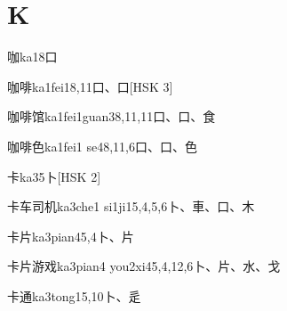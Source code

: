 
\section*{K}

\begin{EntryWithPhonetic}{咖}{ka1}{8}{⼝}
\end{EntryWithPhonetic}

\begin{EntryWithPhonetic}{咖啡}{ka1fei1}{8,11}{⼝、⼝}[HSK 3]
\end{EntryWithPhonetic}

\begin{EntryWithPhonetic}{咖啡馆}{ka1fei1guan3}{8,11,11}{⼝、⼝、⾷}
\end{EntryWithPhonetic}

\begin{EntryWithPhonetic}{咖啡色}{ka1fei1 se4}{8,11,6}{⼝、⼝、⾊}
\end{EntryWithPhonetic}

\begin{EntryWithPhonetic}{卡}{ka3}{5}{⼘}[HSK 2]
\end{EntryWithPhonetic}

\begin{EntryWithPhonetic}{卡车司机}{ka3che1 si1ji1}{5,4,5,6}{⼘、⾞、⼝、⽊}
\end{EntryWithPhonetic}

\begin{EntryWithPhonetic}{卡片}{ka3pian4}{5,4}{⼘、⽚}
\end{EntryWithPhonetic}

\begin{EntryWithPhonetic}{卡片游戏}{ka3pian4 you2xi4}{5,4,12,6}{⼘、⽚、⽔、⼽}
\end{EntryWithPhonetic}

\begin{EntryWithPhonetic}{卡通}{ka3tong1}{5,10}{⼘、⾡}
\end{EntryWithPhonetic}


